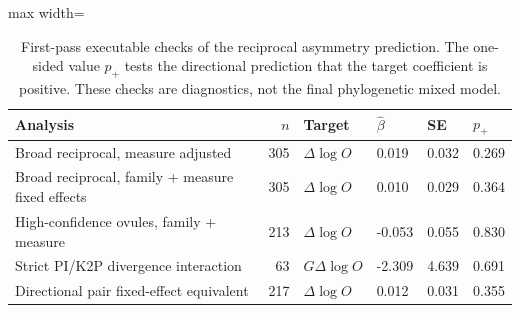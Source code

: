 \begin{table}[H]
\centering
\small
\begin{adjustbox}{max width=\linewidth}
\begin{tabular}{lrllll}
\toprule
Analysis & $n$ & Target & $\hat{\beta}$ & SE & $p_{+}$ \\
\midrule
Broad reciprocal, measure adjusted & 305 & $\Delta\log O$ & 0.019 & 0.032 & 0.269 \\
Broad reciprocal, family + measure fixed effects & 305 & $\Delta\log O$ & 0.010 & 0.029 & 0.364 \\
High-confidence ovules, family + measure & 213 & $\Delta\log O$ & -0.053 & 0.055 & 0.830 \\
Strict PI/K2P divergence interaction & 63 & $G\Delta\log O$ & -2.309 & 4.639 & 0.691 \\
Directional pair fixed-effect equivalent & 217 & $\Delta\log O$ & 0.012 & 0.031 & 0.355 \\
\bottomrule
\end{tabular}
\end{adjustbox}
\caption{First-pass executable checks of the reciprocal asymmetry prediction. The one-sided value $p_{+}$ tests the directional prediction that the target coefficient is positive. These checks are diagnostics, not the final phylogenetic mixed model.}
\label{tab:first-pass-analysis-checks}
\end{table}
